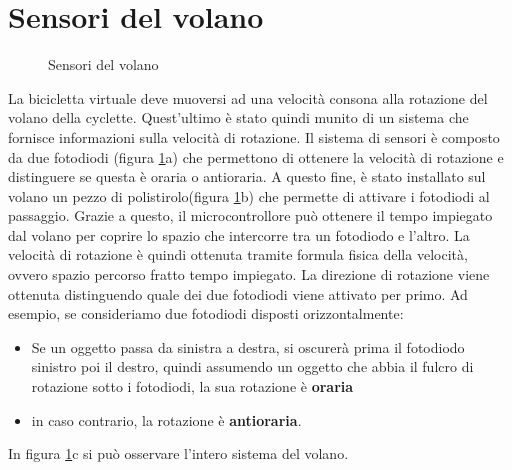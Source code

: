 \section{Sensori del volano}
\begin{figure}%

    \centering
    \caption{Sensori del volano}%
    \label{volano}
\end{figure}
La bicicletta virtuale deve muoversi ad una velocità consona alla rotazione del volano della cyclette. Quest'ultimo è stato quindi munito di un sistema che fornisce informazioni sulla velocità di rotazione. Il sistema di sensori è composto da due fotodiodi (figura \ref{volano}a) che permettono di ottenere la velocità di rotazione e distinguere se questa è oraria o antioraria. A questo fine, è stato installato sul volano un pezzo di polistirolo(figura \ref{volano}b) che permette di attivare i fotodiodi al passaggio. Grazie a questo, il microcontrollore può ottenere il tempo impiegato dal volano per coprire lo spazio che intercorre tra un fotodiodo e l'altro. La velocità di rotazione è quindi ottenuta tramite formula fisica della velocità, ovvero spazio percorso fratto tempo impiegato. La direzione di rotazione viene ottenuta distinguendo quale dei due fotodiodi viene attivato per primo. Ad esempio, se consideriamo due fotodiodi disposti orizzontalmente:\\
\begin{itemize}
  \item Se un oggetto passa da sinistra a destra, si oscurerà prima il fotodiodo sinistro poi il destro, quindi assumendo un oggetto che abbia il fulcro di rotazione sotto i fotodiodi, la sua rotazione è \textbf{oraria}
  \item in caso contrario, la rotazione è \textbf{antioraria}.
\end{itemize}
In figura \ref{volano}c si può osservare l'intero sistema del volano.


